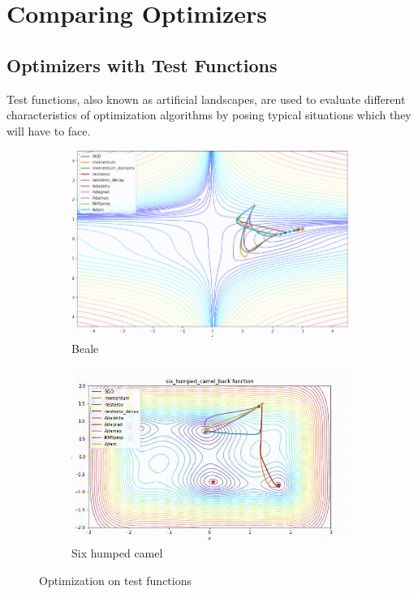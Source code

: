 \documentclass{article}
\begin{document}
\section{Comparing Optimizers}
\subsection{Optimizers with Test Functions}
Test functions, also known as artificial landscapes, are used to evaluate different characteristics of optimization algorithms by posing typical situations which they will have to face. 

\begin{figure}[H]
    \centering
    \begin{subfigure}[b]{0.7\textwidth}
        \includegraphics[width=\textwidth]{beale.png}
        \caption{Beale}
        \label{fig:beale}
    \end{subfigure}
    \begin{subfigure}[b]{0.7\textwidth}
        \includegraphics[width=\textwidth]{sixhumpedcamel.png}
        \caption{Six humped camel}
        \label{fig:sixhumpedcamel}
    \end{subfigure}
    \caption{Optimization on test functions \cite{clark_2017}}\label{fig:optimizationtestfunctions}
\end{figure}
\end{document}
